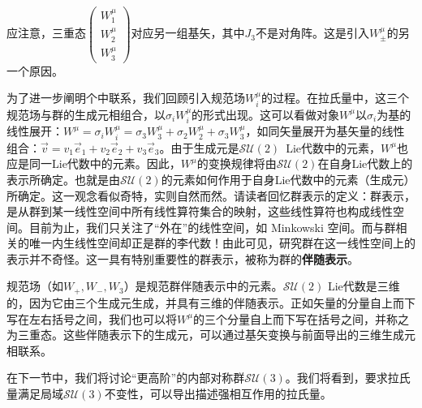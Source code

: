 应注意，三重态$\begin{pmatrix} W^\mu_1 \\ W^\mu_2 \\ W^\mu_3\end{pmatrix}$对应另一组基矢，其中$J_3$不是对角阵。这是引入$W_{\pm}^\mu$的另一个原因。

为了进一步阐明个中联系，我们回顾引入规范场$W^\mu_i$的过程。在拉氏量中，这三个规范场与群的生成元相组合，以$\sigma_iW_i^\mu$的形式出现。这可以看做对象$W^\mu$以$\sigma_i$为基的线性展开：$W^\mu=\sigma_iW_i^\mu=\sigma_3W_3^\mu+\sigma_2W_2^\mu+\sigma_3W_3^\mu$，如同矢量展开为基矢量的线性组合：$\vec{v}=v_1\vec{e}_1+v_2\vec{e}_2+v_3\vec{e}_3$。由于生成元是$\mathcal{SU}(2)$\, Lie代数中的元素，$W^\mu$也应是同一Lie代数中的元素。因此，$W^\mu$的变换规律将由$\mathcal{SU}(2)$在自身Lie代数上的表示所确定。也就是由$\mathcal{SU}(2)$的元素如何作用于自身Lie代数中的元素（生成元）所确定。这一观念看似奇特，实则自然而然。请读者回忆群表示的定义：群表示，是从群到某一线性空间中所有线性算符集合的映射，这些线性算符也构成线性空间。目前为止，我们只关注了“外在”的线性空间，如 Minkowski 空间。而与群相关的唯一内生线性空间却正是群的李代数！由此可见，研究群在这一线性空间上的表示并不奇怪。这一具有特别重要性的群表示，被称为群的{\bfseries 伴随表示}。

规范场（如$W_+,W_-,W_3$）是规范群伴随表示中的元素。$\mathcal{SU}(2)$ Lie代数是三维的，因为它由三个生成元生成，并具有三维的伴随表示。正如矢量的分量自上而下写在左右括号之间，我们也可以将$W^\mu$的三个分量自上而下写在括号之间，并称之为三重态。这些伴随表示下的生成元，可以通过基矢变换与前面导出的三维生成元相联系。

在下一节中，我们将讨论“更高阶”的内部对称群$\mathcal{SU}(3)$。我们将看到，要求拉氏量满足局域$\mathcal{SU}(3)$不变性，可以导出描述强相互作用的拉氏量。

